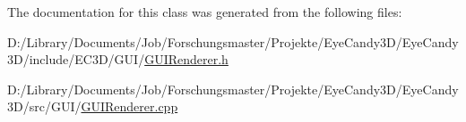 The documentation for this class was generated from the following files\+:\begin{DoxyCompactItemize}
\item 
D\+:/\+Library/\+Documents/\+Job/\+Forschungsmaster/\+Projekte/\+Eye\+Candy3\+D/\+Eye\+Candy3\+D/include/\+E\+C3\+D/\+G\+U\+I/\mbox{\hyperlink{_g_u_i_renderer_8h}{G\+U\+I\+Renderer.\+h}}\item 
D\+:/\+Library/\+Documents/\+Job/\+Forschungsmaster/\+Projekte/\+Eye\+Candy3\+D/\+Eye\+Candy3\+D/src/\+G\+U\+I/\mbox{\hyperlink{_g_u_i_renderer_8cpp}{G\+U\+I\+Renderer.\+cpp}}\end{DoxyCompactItemize}
